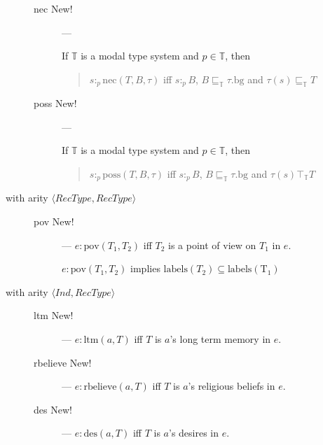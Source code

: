 \begin{description}
  \begin{description}

    
  \item[\textnormal{nec} New!] ---

    If $\mathbb{T}$ is a modal type system and $p\in\mathbb{T}$, then
    \begin{quote}
      $s:_p\mathrm{nec}(T,B,\tau)$ iff $s:_pB$, 
      $B\sqsubseteq_{\mathbb{T}}\tau.\mathrm{bg}$ and 
      $\tau(s)\sqsubseteq_{\mathbb{T}}T$
    \end{quote}

    
  \item[\textnormal{poss} New!] ---

    If $\mathbb{T}$ is a modal type system and $p\in\mathbb{T}$, then
    \begin{quote}
      $s:_p\mathrm{poss}(T,B,\tau)$ iff $s:_pB$, 
      $B\sqsubseteq_{\mathbb{T}}\tau.\mathrm{bg}$ and 
      $\tau(s)\top_{\mathbb{T}}T$
    \end{quote}

  \end{description}

  
\item[with arity
  \textnormal{$\langle\textit{RecType},\textit{RecType}\rangle$}] \mbox{}

  \begin{description}
    
  \item[\textnormal{pov} New!] --- $e:\text{pov}(T_1,T_2)$ iff $T_2$
    is a point of view on $T_1$ in $e$.

    $e:\text{pov}(T_1,T_2)$ implies
    $\mathrm{labels}(T_2)\subseteq\mathrm{labels(T_1)}$

  \end{description}

  
\item[with arity
  \textnormal{$\langle\textit{Ind},\textit{RecType}\rangle$}] \mbox{}

  \begin{description}
    
  \item[\textnormal{ltm} New!] --- $e:\text{ltm}(a,T)$ iff $T$ is $a$'s
    long term memory in $e$.
    
  \item[\textnormal{rbelieve} New!] --- $e:\text{rbelieve}(a,T)$ iff
    $T$ is $a$'s religious beliefs in $e$.

    
  \item[\textnormal{des} New!] --- $e:\text{des}(a,T)$ iff $T$ is
    $a$'s desires in $e$.

  \end{description}
  
  

  
  
  


\end{description}

